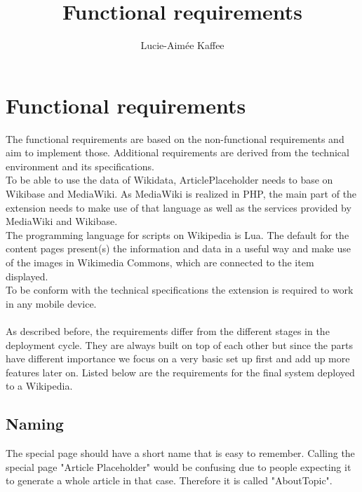 \documentclass[11pt]{article}
\title {{Functional requirements}}
\author {Lucie-Aim\'{e}e Kaffee}
\date{}
\begin{document}
\listoftodos

\section {Functional requirements}
The functional requirements are based on the non-functional requirements and aim to implement those. Additional requirements are derived from the technical environment and its specifications. \\
To be able to use the data of Wikidata, ArticlePlaceholder needs to base on Wikibase and MediaWiki.
As MediaWiki is realized in PHP, the main part of the extension needs to make use of that language as well as the services provided by MediaWiki and Wikibase. \\
The programming language for scripts on Wikipedia is Lua. %
The default for the content pages present(s) the information and data in a useful way and make use of the images in Wikimedia Commons, which are connected to the item displayed.\\
To be conform with the technical specifications the extension is required to work in any mobile device. \\
\\
As described before, the requirements differ from the different stages in the deployment cycle. They are always built on top of each other but since the parts have different importance we focus on a very basic set up first and add up more features later on. Listed below are the requirements for the final system deployed to a Wikipedia. \\

\subsection{Naming}
The special page should have a short name that is easy to remember. Calling the special page "Article Placeholder" would be confusing due to people expecting it to generate a whole article in that case. Therefore it is called "AboutTopic". %
\end{document}
